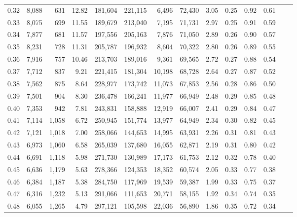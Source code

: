 \begin{tabular}{rrrrrrrrrrrrrr}
0.32 &  8,088 &    631 &    12.82 &  181,604 &  221,115 &   6,496 &  72,430 &  3.05 &  0.25 &  0.92 &      0.61 \\
0.33 &  8,075 &    699 &    11.55 &  189,679 &  213,040 &   7,195 &  71,731 &  2.97 &  0.25 &  0.91 &      0.59 \\
0.34 &  7,877 &    681 &    11.57 &  197,556 &  205,163 &   7,876 &  71,050 &  2.89 &  0.26 &  0.90 &      0.57 \\
0.35 &  8,231 &    728 &    11.31 &  205,787 &  196,932 &   8,604 &  70,322 &  2.80 &  0.26 &  0.89 &      0.55 \\
0.36 &  7,916 &    757 &    10.46 &  213,703 &  189,016 &   9,361 &  69,565 &  2.72 &  0.27 &  0.88 &      0.54 \\
0.37 &  7,712 &    837 &     9.21 &  221,415 &  181,304 &  10,198 &  68,728 &  2.64 &  0.27 &  0.87 &      0.52 \\
0.38 &  7,562 &    875 &     8.64 &  228,977 &  173,742 &  11,073 &  67,853 &  2.56 &  0.28 &  0.86 &      0.50 \\
0.39 &  7,501 &    904 &     8.30 &  236,478 &  166,241 &  11,977 &  66,949 &  2.48 &  0.29 &  0.85 &      0.48 \\
0.40 &  7,353 &    942 &     7.81 &  243,831 &  158,888 &  12,919 &  66,007 &  2.41 &  0.29 &  0.84 &      0.47 \\
0.41 &  7,114 &  1,058 &     6.72 &  250,945 &  151,774 &  13,977 &  64,949 &  2.34 &  0.30 &  0.82 &      0.45 \\
0.42 &  7,121 &  1,018 &     7.00 &  258,066 &  144,653 &  14,995 &  63,931 &  2.26 &  0.31 &  0.81 &      0.43 \\
0.43 &  6,973 &  1,060 &     6.58 &  265,039 &  137,680 &  16,055 &  62,871 &  2.19 &  0.31 &  0.80 &      0.42 \\
0.44 &  6,691 &  1,118 &     5.98 &  271,730 &  130,989 &  17,173 &  61,753 &  2.12 &  0.32 &  0.78 &      0.40 \\
0.45 &  6,636 &  1,179 &     5.63 &  278,366 &  124,353 &  18,352 &  60,574 &  2.05 &  0.33 &  0.77 &      0.38 \\
0.46 &  6,384 &  1,187 &     5.38 &  284,750 &  117,969 &  19,539 &  59,387 &  1.99 &  0.33 &  0.75 &      0.37 \\
0.47 &  6,316 &  1,232 &     5.13 &  291,066 &  111,653 &  20,771 &  58,155 &  1.92 &  0.34 &  0.74 &      0.35 \\
0.48 &  6,055 &  1,265 &     4.79 &  297,121 &  105,598 &  22,036 &  56,890 &  1.86 &  0.35 &  0.72 &      0.34 \\

\end{tabular}
